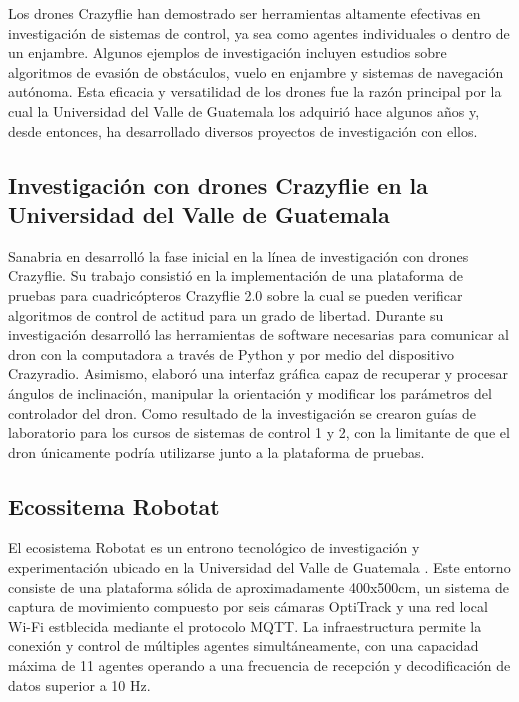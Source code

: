 Los drones Crazyflie han demostrado ser herramientas altamente efectivas en investigación de sistemas de control, ya sea como agentes individuales o dentro de un enjambre. Algunos ejemplos de investigación incluyen estudios sobre algoritmos de evasión de obstáculos, vuelo en enjambre y sistemas de navegación autónoma. Esta eficacia y versatilidad de los drones fue la razón principal por la cual la Universidad del Valle de Guatemala los adquirió hace algunos años y, desde entonces, ha desarrollado diversos proyectos de investigación con ellos.

\subsection*{Investigación con drones Crazyflie en la Universidad del Valle de Guatemala}
Sanabria en \cite{Sanabria2022_tesis} desarrolló la fase inicial en la línea de investigación con drones Crazyflie. Su trabajo consistió en la implementación de una plataforma de pruebas para cuadricópteros Crazyflie 2.0 sobre la cual se pueden verificar algoritmos de control de actitud para un grado de libertad. Durante su investigación desarrolló las herramientas de software necesarias para comunicar al dron con la computadora a través de Python y por medio del dispositivo Crazyradio. Asimismo, elaboró una interfaz gráfica capaz de recuperar y procesar ángulos de inclinación, manipular la orientación y modificar los parámetros del controlador del dron. Como resultado de la investigación se crearon guías de laboratorio para los cursos de sistemas de control 1 y 2, con la limitante de que el dron únicamente podría utilizarse junto a la plataforma de pruebas.

\subsection*{Ecossitema Robotat}
El ecosistema Robotat es un entrono tecnológico de investigación y experimentación ubicado en la Universidad del Valle de Guatemala \cite{Parafan2022_tesis}. Este entorno consiste de una plataforma sólida de aproximadamente 400x500cm, un sistema de captura de movimiento compuesto por seis cámaras OptiTrack y una red local Wi-Fi estblecida mediante el protocolo MQTT. La infraestructura permite la conexión y control de múltiples agentes simultáneamente, con una capacidad máxima de 11 agentes operando a una frecuencia de recepción y decodificación de datos superior a 10 Hz. 

